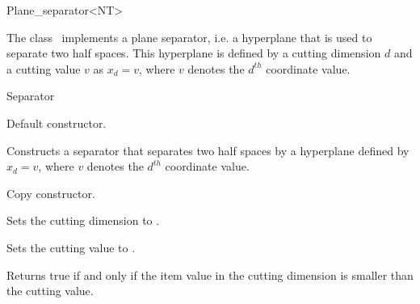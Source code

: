 

\begin{ccRefClass}{Plane_separator<NT>}  %


\ccDefinition

\begin{ccAdvanced}
  
The class \ccRefName\ implements a plane separator, i.e. a hyperplane that is used to separate two half spaces.
This hyperplane is defined by a cutting dimension $d$ and a cutting value $v$
as $x_d=v$, where $v$ denotes the $d^{th}$ coordinate value.


\ccIsModel

Separator

\ccCreation
{}  %

{Default constructor.}

{Constructs a separator that separates two half spaces by a hyperplane
defined by $x_d=v$, where $v$ denotes the $d^{th}$ coordinate value.}

{Copy constructor.}


{Sets the cutting dimension to . }

{Sets the cutting value to . }



{Returns true if and only if the item value in the cutting dimension is smaller than the cutting value.}


\end{ccAdvanced}
\end{ccRefClass}
